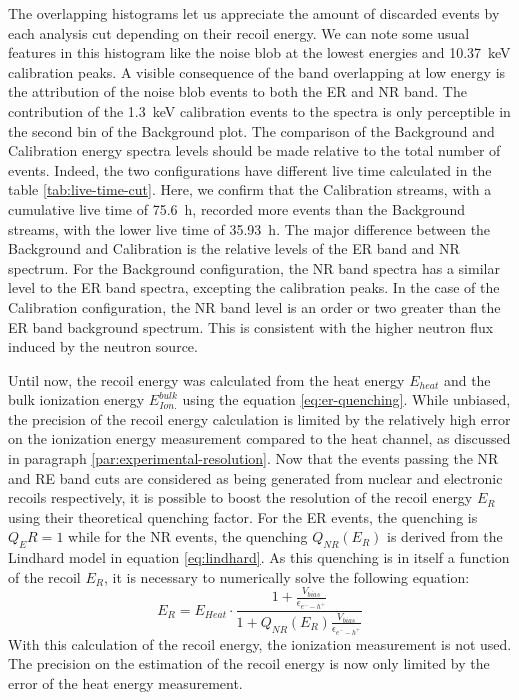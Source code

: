 The overlapping histograms let us appreciate the amount of discarded events by each analysis cut depending on their recoil energy. We can note some usual features in this histogram like the noise blob at the lowest energies and \SI{10.37}{\kilo\eV} calibration peaks. A visible consequence of the band overlapping at low energy is the attribution of the noise blob events to both the ER and NR band. The contribution of the \SI{1.3}{\kilo\eV} calibration events to the spectra is only perceptible in the second bin of the Background plot.
The comparison of the Background and Calibration energy spectra levels should be made relative to the total number of events. Indeed, the two configurations have different live time calculated in the table \ref{tab:live-time-cut}. Here, we confirm that the Calibration streams, with a cumulative live time of \SI{75.6}{\hour}, recorded more events than the Background streams, with the lower live time of \SI{35.93}{\hour}.
The major difference between the Background and Calibration is the relative levels of the ER band and NR spectrum. For the Background configuration, the NR band spectra has a similar level to the ER band spectra, excepting the calibration peaks. In the case of the Calibration configuration, the NR band level is an order or two greater than the ER band background spectrum. This is consistent with the higher neutron flux induced by the neutron source.

Until now, the recoil energy was calculated from the heat energy $E_{heat}$ and the bulk ionization energy $E_{Ion.}^{bulk}$ using the equation \ref{eq:er-quenching}. While unbiased, the precision of the recoil energy calculation is limited by the relatively high error on the ionization energy measurement compared to the heat channel, as discussed in paragraph \ref{par:experimental-resolution}. Now that the events passing the NR and RE band cuts are considered as being generated from nuclear and electronic recoils respectively, it is possible to boost the resolution of the recoil energy $E_R$ using their theoretical quenching factor. For the ER events, the quenching is $Q_ER=1$ while for the NR events, the quenching $Q_{NR} (E_R)$ is derived from the Lindhard model in equation \ref{eq:lindhard}. As this quenching is in itself a function of the recoil $E_R$, it is necessary to numerically solve the following equation:
\begin{equation}
\label{eq:er-from-heat}
E_R 
=
E_{Heat} 
\cdot
\frac{
1 + \frac{V_{bias}}{\epsilon_{e^--h^+}}
}{
1 + Q_{NR} \left( E_R \right)\frac{V_{bias}}{\epsilon_{e^--h^+}}
}
\end{equation}
With this calculation of the recoil energy, the ionization measurement is not used. The precision on the estimation of the recoil energy is now only limited by the error of the heat energy measurement.

